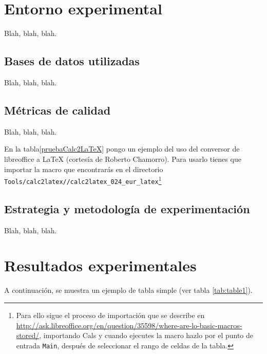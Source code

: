 \section{Entorno experimental}
\label{sec:entorno-experimental}

Blah, blah, blah.


\subsection{Bases de datos utilizadas}
\label{sec:bases-de-datos-1}

Blah, blah, blah.


\subsection{Métricas de calidad}
\label{sec:metricas-de-calidad}

Blah, blah, blah.

En la tabla\ref{pruebaCalc2LaTeX} pongo un ejemplo del uso del conversor de libreoffice a \LaTeX{} (cortesía de Roberto Chamorro). Para usarlo tienes que importar la macro que encontrarás en el directorio \texttt{Tools/calc2latex//calc2latex\_024\_eur\_latex}\footnote{Para ello sigue el proceso de importación que se describe en \url{http://ask.libreoffice.org/en/question/35598/where-are-lo-basic-macros-stored/}, importando Cals y cuando ejecutes la macro hazlo por el punto de entrada \texttt{Main}, después de seleccionar el rango de celdas de la tabla.}




\subsection{Estrategia y metodología de experimentación}
\label{sec:estr-y-metod}

Blah, blah, blah.


\section{Resultados experimentales}
\label{sec:result-experim}

A continuación, se muestra un ejemplo de tabla simple (ver tabla \ref{tab:table1}).

